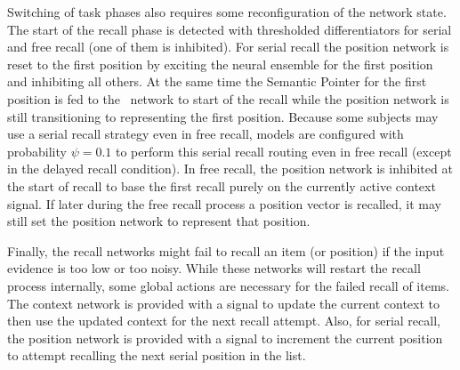 Switching of task phases also requires some reconfiguration of the network state.
The start of the recall phase is detected with thresholded differentiators for serial and free recall (one of them is inhibited).
For serial recall the position network is reset to the first position by exciting the neural ensemble for the first position and inhibiting all others.
At the same time the Semantic Pointer for the first position is fed to the \mft\ network to start of the recall while the position network is still transitioning to representing the first position.
Because some subjects may use a serial recall strategy even in free recall, models are configured with probability $\psi = 0.1$ to perform this serial recall routing even in free recall (except in the delayed recall condition).
In free recall, the position network is inhibited at the start of recall to base the first recall purely on the currently active context signal.
If later during the free recall process a position vector is recalled, it may still set the position network to represent that position.

Finally, the recall networks might fail to recall an item (or position) if the input evidence is too low or too noisy.
While these networks will restart the recall process internally, some global actions are necessary for the failed recall of items.
The context network is provided with a signal to update the current context to then use the updated context for the next recall attempt.
Also, for serial recall, the position network is provided with a signal to increment the current position to attempt recalling the next serial position in the list.
